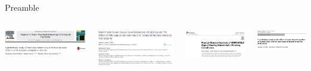 \documentclass[aspectratio=169,xcolor=dvipsnames]{beamer}
\begin{document}
\begin{frame}{Preamble}
\begin{columns}[c]
\includegraphics[width=1\textwidth]{imgs/lit1}

\vspace{1cm}

\includegraphics[width=1\textwidth]{imgs/lit3}

\vspace{1cm}

\includegraphics[width=1\textwidth]{imgs/lit5}


\includegraphics[width=1\textwidth]{imgs/lit2}


\end{columns}
\end{frame}
\end{document}

